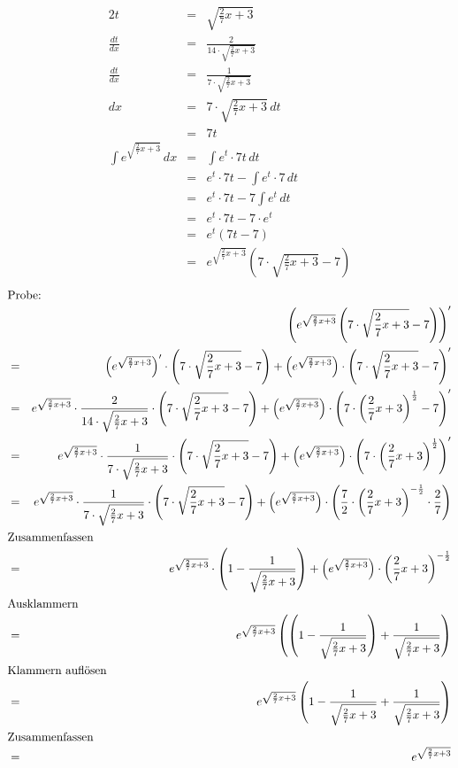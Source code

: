 \documentclass[10pt,a4paper,oneside,ngerman,numbers=noenddot]{scrartcl}
\begin{document}
\subsubsection{} %
\begin{alignat*}{2}
t &=& \sqrt{\frac{2}{7}x+3} \\
\frac{dt}{dx} &=& \frac{2}{14 \cdot \sqrt{\frac{2}{7}x+3}} \\
\frac{dt}{dx} &=& \frac{1}{7 \cdot \sqrt{\frac{2}{7}x+3}} \\
dx &=& 7 \cdot \sqrt{\frac{2}{7}x+3}\, dt \\
&=& 7t\\
\int e^{\sqrt{\frac{2}{7}x+3}}\,dx &=& \int e^{t} \cdot 7t\,dt \\
&=& e^{t} \cdot 7t - \int e^{t} \cdot 7\,dt \\
&=& e^{t} \cdot 7t - 7\int e^{t}\,dt \\
&=& e^{t} \cdot 7t - 7 \cdot e^{t} \\
&=& e^{t}(7t - 7) \\
&=& e^{\sqrt{\frac{2}{7}x+3}}\left(7 \cdot \sqrt{\frac{2}{7}x+3} - 7\right)
\end{alignat*}
\begin{alignat*}{2}
\intertext{Probe:}
&& \left(e^{\sqrt{\frac{2}{7}x+3}}\left(7 \cdot \sqrt{\frac{2}{7}x+3} - 7\right) \right)' \\
&=& \left(e^{\sqrt{\frac{2}{7}x+3}}\right)' \cdot \left(7 \cdot \sqrt{\frac{2}{7}x+3} - 7\right) + \left(e^{\sqrt{\frac{2}{7}x+3}}\right) \cdot \left(7 \cdot \sqrt{\frac{2}{7}x+3} - 7\right)' \\
&=& e^{\sqrt{\frac{2}{7}x+3}} \cdot \frac{2}{14 \cdot \sqrt{\frac{2}{7}x+3}} \cdot \left(7 \cdot \sqrt{\frac{2}{7}x+3} - 7\right) + \left(e^{\sqrt{\frac{2}{7}x+3}}\right) \cdot \left(7 \cdot \left(\frac{2}{7}x+3\right)^{\frac{1}{2}} - 7\right)' \\
&=& e^{\sqrt{\frac{2}{7}x+3}} \cdot \frac{1}{7 \cdot \sqrt{\frac{2}{7}x+3}} \cdot \left(7 \cdot \sqrt{\frac{2}{7}x+3} - 7\right) + \left(e^{\sqrt{\frac{2}{7}x+3}}\right) \cdot \left(7 \cdot \left(\frac{2}{7}x+3\right)^{\frac{1}{2}}\right)'\\
&=& e^{\sqrt{\frac{2}{7}x+3}} \cdot \frac{1}{7 \cdot \sqrt{\frac{2}{7}x+3}} \cdot \left(7 \cdot \sqrt{\frac{2}{7}x+3} - 7\right) + \left(e^{\sqrt{\frac{2}{7}x+3}}\right) \cdot \left(\frac{7}{2} \cdot \left(\frac{2}{7}x+3\right)^{-\frac{1}{2}} \cdot \frac{2}{7}\right) \\
\intertext{Zusammenfassen}
&=& e^{\sqrt{\frac{2}{7}x+3}} \cdot \left(1 - \frac{1}{\sqrt{\frac{2}{7}x+3}}\right) + \left(e^{\sqrt{\frac{2}{7}x+3}}\right) \cdot \left(\frac{2}{7}x+3\right)^{-\frac{1}{2}} \\
\intertext{Ausklammern}
&=& e^{\sqrt{\frac{2}{7}x+3}} \left(\left(1 - \frac{1}{\sqrt{\frac{2}{7}x+3}}\right) + \frac{1}{\sqrt{\frac{2}{7}x+3}} \right) \\
\intertext{Klammern auflösen}
&=& e^{\sqrt{\frac{2}{7}x+3}} \left(1 - \frac{1}{\sqrt{\frac{2}{7}x+3}} + \frac{1}{\sqrt{\frac{2}{7}x+3}}\right) \\
\intertext{Zusammenfassen}
&=& e^{\sqrt{\frac{2}{7}x+3}}
\end{alignat*}
\end{document}
